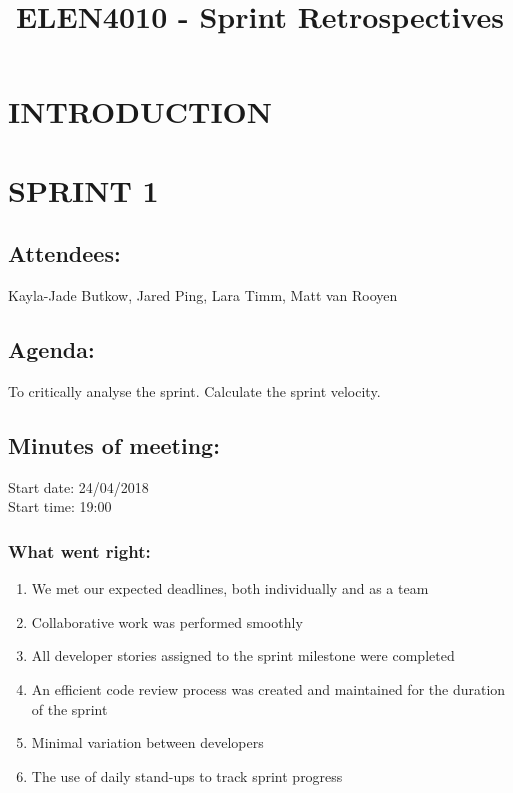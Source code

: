 \documentclass[10pt,onecolumn]{witseiepaper}
\title{ELEN4010 - Sprint Retrospectives}
\author{}
\begin{document}
\maketitle
\pagestyle{plain}
\setcounter{page}{1}

\section{INTRODUCTION}

\section*{SPRINT 1}
\subsection*{Attendees:}
Kayla-Jade Butkow, Jared Ping, Lara Timm, Matt van Rooyen
\subsection*{Agenda:} 
To critically analyse the sprint. Calculate the sprint velocity.

\subsection*{Minutes of meeting:}
Start date: 24/04/2018 \\
Start time: 19:00

\subsubsection*{What went right:}
\begin{enumerate}
	\item We met our expected deadlines, both individually and as a team
	\item Collaborative work was performed smoothly
	\item All developer stories assigned to the sprint milestone were completed
	\item An efficient code review process was created and maintained for the duration of the sprint
	\item Minimal variation between developers 
	\item The use of daily stand-ups to track sprint progress
\end{enumerate}
\end{document}
